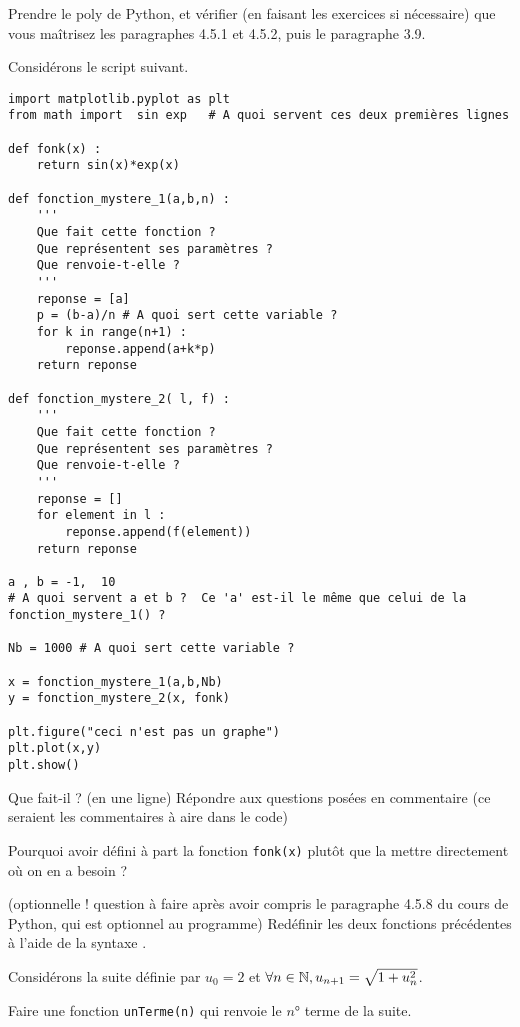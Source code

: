 \begin{enonce}

\ques Prendre le poly de Python, et vérifier (en faisant les exercices si nécessaire) que vous maîtrisez les paragraphes 4.5.1 et 4.5.2, puis le paragraphe 3.9.

\ques Considérons le script suivant. 
\begin{verbatim}
import matplotlib.pyplot as plt
from math import  sin exp   # A quoi servent ces deux premières lignes

def fonk(x) :
    return sin(x)*exp(x)

def fonction_mystere_1(a,b,n) :
    '''
    Que fait cette fonction ?
    Que représentent ses paramètres ?
    Que renvoie-t-elle ?
    '''
    reponse = [a]
    p = (b-a)/n # A quoi sert cette variable ?
    for k in range(n+1) :
        reponse.append(a+k*p)
    return reponse

def fonction_mystere_2( l, f) :
    '''
    Que fait cette fonction ?
    Que représentent ses paramètres ?
    Que renvoie-t-elle ?
    '''
    reponse = []
    for element in l :
        reponse.append(f(element))
    return reponse

a , b = -1,  10
# A quoi servent a et b ?  Ce 'a' est-il le même que celui de la fonction_mystere_1() ?

Nb = 1000 # A quoi sert cette variable ?

x = fonction_mystere_1(a,b,Nb)
y = fonction_mystere_2(x, fonk)

plt.figure("ceci n'est pas un graphe") 
plt.plot(x,y)
plt.show()
\end{verbatim}
\ssques Que fait-il ? (en une ligne)
\ssques Répondre aux questions posées en commentaire (ce seraient les commentaires à aire dans le code)

\ssques Pourquoi avoir défini à part la fonction \texttt{fonk(x)} plutôt que la mettre directement où on en a besoin ?

\ssques (optionnelle ! question à faire après avoir compris le paragraphe 4.5.8 du cours de Python, qui est optionnel au programme)
Redéfinir les deux fonctions précédentes à l'aide de la syntaxe .

\ques Considérons la suite définie par $u_0=2$ et $\forall n\in\mathbb{N}, u_{n+1}=\sqrt{1+u_n^2}$.

\ssques Faire une fonction \texttt{unTerme(n)} qui renvoie le $n°$ terme de la suite.


\end{enonce}
